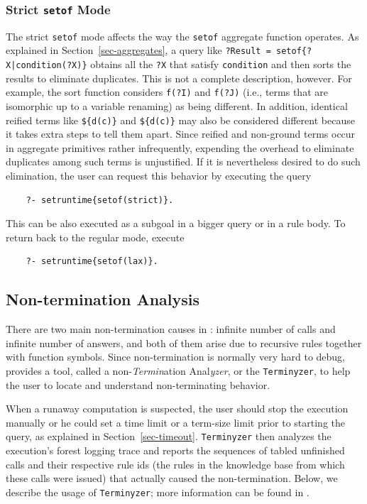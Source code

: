 \documentclass[11pt]{article}
\newcommand{\ERGO}{\mbox{\smaller{\ensuremath{\cal{E}}\smaller{{\sc{RGO}}}}}\xspace}
\newcommand{\FLSYSTEM}{\ERGO}
\begin{document}
\subsubsection{Strict \texttt{setof} Mode} \label{sec-strict-setof}

The strict \texttt{setof} mode affects the way the \texttt{setof} aggregate
function operates.  
As explained in Section~\ref{sec-aggregates},
a query like \texttt{?Result = setof\{?X|condition(?X)\}} obtains all the
\texttt{?X} that satisfy \texttt{condition} and then sorts the results to
eliminate duplicates. This is not a complete description, however.
For example, the sort function considers \texttt{f(?I)} and \texttt{f(?J)}
(i.e., terms that are isomorphic up to a variable renaming) as being
different. In addition, identical reified terms like \texttt{\$\{d(c)\}} and
\texttt{\$\{d(c)\}} may also be considered different because it takes  extra
steps to tell them apart. Since reified and non-ground
terms occur in aggregate primitives
rather infrequently, expending the overhead to eliminate duplicates among
such terms is unjustified. If it is nevertheless desired to do such
elimination, the user can request this behavior by executing the query
\begin{verbatim}
    ?- setruntime{setof(strict)}.
\end{verbatim}
This can be also executed as a subgoal in a bigger query or in a rule body.
To return back to the regular mode, execute
\begin{verbatim}
    ?- setruntime{setof(lax)}.
\end{verbatim}


\subsection{Non-termination Analysis}\label{sec-terminyzer}

There are two main non-termination causes in \FLSYSTEM: infinite number of
calls and infinite number of answers, and both of them arise due to
recursive rules together with function symbols. 
Since non-termination is normally very hard to debug, \FLSYSTEM provides 
a tool, called a
non-\emph{Termin}ation Anal\emph{yzer}, or the
\texttt{Terminyzer}, to help the user to locate and understand
non-terminating behavior. 

When a runaway computation is suspected, the user should stop the execution
manually or he could set a 
time limit or a term-size limit prior to starting the query, as explained
in Section~\ref{sec-timeout}.
\texttt{Terminyzer} then analyzes the execution's forest logging trace
and reports the sequences of tabled unfinished calls and their
respective rule ids (the rules in the knowledge base from which these
calls were issued) that actually caused the non-termination.
Below, we describe the usage of \texttt{Terminyzer}; more
information can be found in \cite{terminyzer2,liang-padl-13}.
\end{document}
